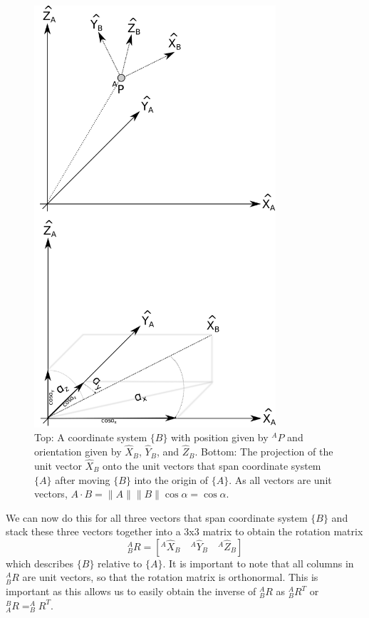 \begin{figure}
	\centering
		\includegraphics[width=0.8\textwidth]{figs/projection.png}
	\caption{Top: A coordinate system $\{B\}$ with position given by $^AP$ and orientation given by $\hat{X}_B$, $\hat{Y}_B$, and $\hat{Z}_B$. Bottom: 
	The projection of the unit vector $\hat{X}_B$ onto the unit vectors that span coordinate system $\{A\}$ after moving $\{B\}$ into the origin of $\{A\}$. As all vectors are unit vectors, $A\cdot B=\|A\|\|B\|\cos \alpha=\cos \alpha$. }
	\label{fig:projection}
\end{figure}

We can now do this for all three vectors that span coordinate system $\{B\}$ and stack these three vectors together into a 3x3 matrix to obtain the rotation matrix
%
\begin{equation}
^A_BR=[^A\hat{X}_B \quad ^A\hat{Y}_B \quad ^A\hat{Z}_B]
\end{equation}
%
which describes $\{B\}$ relative to $\{A\}$. It is important to note that all columns in $ ^A_BR$ are unit vectors, so that the rotation matrix is orthonormal. This is important as this allows us to easily obtain the inverse of $ ^A_BR$ as $ ^A_BR^T$ or
$ ^B_AR=^A_BR^T$. 

